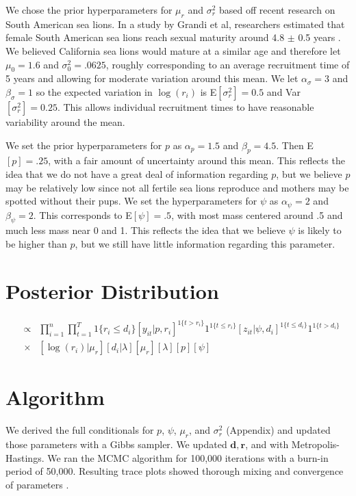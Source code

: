 \documentclass[12pt, a4paper]{article}
\begin{document}
We chose the prior hyperparameters for $\mu_r$ and $\sigma_r^2$ based off recent research on South American sea lions. In a study by Grandi et al, researchers estimated that female South American sea lions reach sexual maturity around 4.8 $\pm$ 0.5 years \cite{Grandi}. We believed California sea lions would mature at a similar age and therefore let $\mu_0 = 1.6$ and $\sigma_0^2 = .0625$, roughly corresponding to an average recruitment time of 5 years and allowing for moderate variation around this mean. We let $\alpha_{\sigma} = 3$ and $\beta_{\sigma} = 1$ so the expected variation in $\log(r_i)$ is E$[\sigma_r^2] = 0.5$ and Var$[\sigma_r^2] = 0.25$. This allows individual recruitment times to have reasonable variability around the mean. 

We set the prior hyperparameters for $p$ as $\alpha_p = 1.5$ and $\beta_p = 4.5$. Then E$[p] = .25$, with a fair amount of uncertainty around this mean. This reflects the idea that we do not have a great deal of information regarding $p$, but we believe $p$ may be relatively low since not all fertile sea lions reproduce and mothers may be spotted without their pups. We set the hyperparameters for $\psi$ as $\alpha_{\psi} = 2$ and $\beta_{\psi} = 2$. This corresponds to E$[\psi] = .5$, with most mass centered around .5 and much less mass near 0 and 1. This reflects the idea that we believe $\psi$ is likely to be higher than $p$, but we still have little information regarding this parameter.  

\section{Posterior Distribution}
\begin{eqnarray*}
[\log (\mathbf{r}), \mu_r, p, \mathbf{d}, \lambda, \psi | \mathbf{z}, \mathbf{y} ] & \propto & \prod_{i=1}^n \prod_{t=1} ^T  1\{r_i \leq d_i \} [y_{it}|p,r_i]^{1\{ t > r_i \}} 1^{1\{ t \leq r_i \}} [z_{it}|\psi, d_i]^{1 \{ t \leq d_i\} } 1^{1 \{ t > d_i\}} \\
  & \times & [\log(r_i)|\mu_r][d_i|\lambda]  [\mu_r][\lambda][p][\psi]
\end{eqnarray*}


\section{Algorithm}

We derived the full conditionals for $p$, $\psi$, $\mu_r$, and $\sigma_r^2$ (Appendix) and updated those parameters with a Gibbs sampler. We updated $\mathbf{d}, \mathbf{r}$, and with Metropolis-Hastings. We ran the MCMC algorithm for 100,000 iterations with a burn-in period of 50,000. Resulting trace plots showed thorough mixing and convergence of parameters . 
\end{document}
